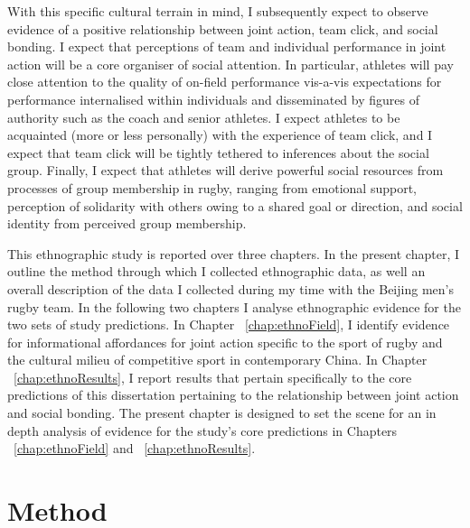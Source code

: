\begin{CJK}{UTF8}{gbsn}
With this specific cultural terrain in mind, I subsequently expect to observe evidence of a positive relationship between joint action, team click, and social bonding.  I expect that perceptions of team and individual performance in joint action will be a core organiser of social attention.  In particular, athletes will pay close attention to
the quality of on-field performance vis-a-vis expectations for performance internalised within individuals and disseminated by figures of authority such as the coach and senior athletes.  I expect athletes to be acquainted (more or less personally) with the experience of team click, and I expect that team click will be tightly tethered to inferences about the social group.  Finally, I expect that athletes will derive powerful social resources from processes of group membership in rugby, ranging from emotional support, perception of solidarity with others owing to a shared goal or direction, and social identity from perceived group membership.


This ethnographic study is reported over three chapters.  In the present chapter, I outline the method through which I collected ethnographic data, as well an overall description of the data I collected during my time with the Beijing men's rugby team.  In the following two chapters I analyse ethnographic evidence for the two sets of study predictions.  In Chapter ~\ref{chap:ethnoField}, I identify evidence for informational affordances for joint action specific to the sport of rugby and the cultural milieu of competitive sport in contemporary China.  In Chapter ~\ref{chap:ethnoResults}, I report results that pertain specifically to the core predictions of this dissertation pertaining to the relationship between joint action and social bonding.  The present chapter is designed to set the scene for an in depth analysis of evidence for the study's core predictions in Chapters ~\ref{chap:ethnoField} and ~\ref{chap:ethnoResults}.







\section{Method}


\end{CJK}
